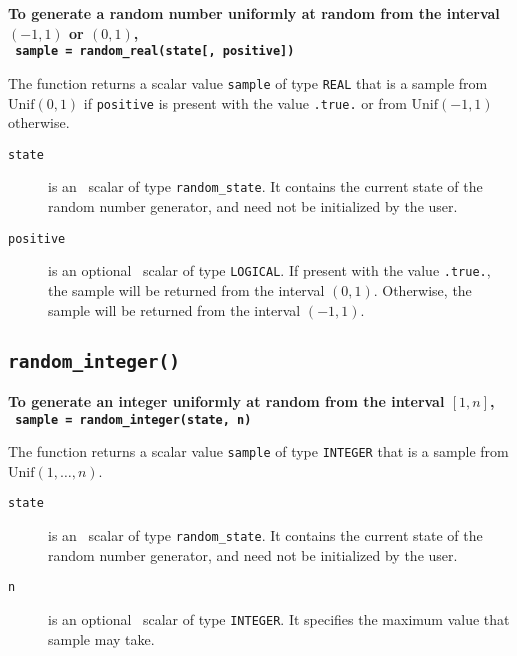 \textbf{\noindent
   To generate a random number uniformly at random from the interval $(-1,1)$ or $(0,1)$,
   \vspace*{0.1cm} \\
   \texttt{ \hspace*{0.2cm}
      sample = random\_real(state[, positive])
   }
   \vspace{0.3cm}
}

\noindent
The function returns a scalar value {\tt sample} of type {\tt REAL} that is a
sample from $\mathrm{Unif}(0,1)$ if {\tt positive} is present with the value
{\tt .true.} or from $\mathrm{Unif}(-1,1)$ otherwise.

\begin{description}

\item[\texttt{state}] is an \intentinout\ scalar of
type  {\tt random\_state}. It contains the current state of the random number
generator, and need not be initialized by the user.

\item[\texttt{positive}] is an optional \intentin\ scalar of type {\tt LOGICAL}.
   If present with the value {\tt .true.}, the sample will be returned from
   the interval $(0,1)$. Otherwise, the sample will be returned from the
   interval $(-1,1)$.

\end{description}

\subsection{\texttt{random\_integer()}}

\textbf{\noindent
   To generate an integer uniformly at random from the interval $[1,n]$,
   \vspace*{0.1cm} \\
   \texttt{ \hspace*{0.2cm}
      sample = random\_integer(state, n)
   }
   \vspace{0.3cm}
}

\noindent
The function returns a scalar value {\tt sample} of type {\tt INTEGER} that is a
sample from $\mathrm{Unif}(1, \ldots, n)$.

\begin{description}

\item[\texttt{state}] is an \intentinout\ scalar of
type  {\tt random\_state}. It contains the current state of the random number
generator, and need not be initialized by the user.

\item[\texttt{n}] is an optional \intentin\ scalar of type {\tt INTEGER}.
   It specifies the maximum value that sample may take.

\end{description}


